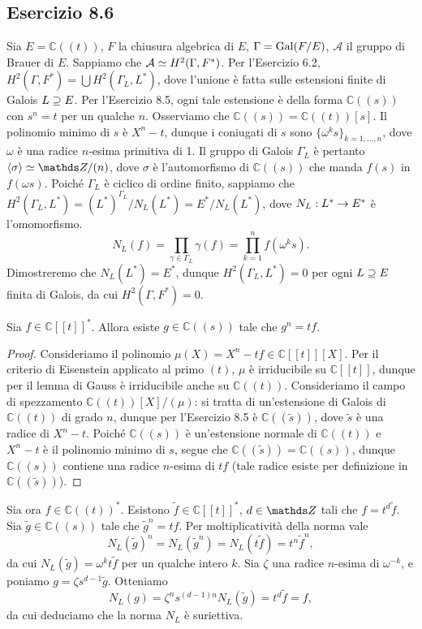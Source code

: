 \documentclass[a4paper]{article}
\newcommand*{\CC}{\mathds{C}}
\begin{document}
\subsection*{Esercizio 8.6}
Sia $E=\CC((t))$, $F$ la chiusura algebrica di $E$, $\Gamma=\operatorname{Gal}(F/E)$, $\mathcal{A}$ il gruppo di Brauer di $E$. Sappiamo che $\mathcal{A}\simeq H^2(\Gamma,F^*)$. Per l'Esercizio 6.2, $H^2(\Gamma, F^*)=\bigcup H^2(\Gamma_L,L^*)$, dove l'unione è fatta sulle estensioni finite di Galois $L\supseteq E$. Per l'Esercizio 8.5, ogni tale estensione è della forma $\CC((s))$ con $s^n=t$ per un qualche $n$. Osserviamo che $\CC((s))=\CC((t))[s]$. Il polinomio minimo di $s$ è $X^n-t$, dunque i coniugati di $s$ sono $\{\omega^ks\}_{k=1,\ldots,n}$, dove $\omega$ è una radice $n$-esima primitiva di 1. Il gruppo di Galois $\Gamma_L$ è pertanto $\langle\sigma\rangle\iso\ZZ/(n)$, dove $\sigma$ è l'automorfismo di $\CC((s))$ che manda $f(s)$ in $f(\omega s)$. Poiché $\Gamma_L$ è ciclico di ordine finito, sappiamo che $H^2(\Gamma_L,L^*)=(L^*)^{\Gamma_L}/N_L(L^*)=E^*/N_L(L^*)$, dove $N_L:L^*\rightarrow E^*$ è l'omomorfismo.
$$
N_L(f)=\prod_{\gamma\in\Gamma_L}\gamma(f)=\prod_{k=1}^{n}f(\omega^ks).
$$
Dimostreremo che $N_L(L^*)=E^*$, dunque $H^2(\Gamma_L,L^*)=0$ per ogni $L\supseteq E$ finita di Galois, da cui $H^2(\Gamma,F^*)=0$.

\begin{lemma*}
Sia $f\in\CC[[t]]^*$. Allora esiste $g\in\CC((s))$ tale che $g^n=tf$.
\end{lemma*}
\begin{proof}
Consideriamo il polinomio $\mu(X)=X^n-tf\in\CC[[t]][X]$. Per il criterio di Eisenstein applicato al primo $(t)$, $\mu$ è irriducibile su $\CC[[t]]$, dunque per il lemma di Gauss è irriducibile anche su $\CC((t))$. Consideriamo il campo di spezzamento $\CC((t))[X]/(\mu)$: si tratta di un'estensione di Galois di $\CC((t))$ di grado $n$, dunque per l'Esercizio 8.5 è $\CC((\tilde{s}))$, dove $\tilde{s}$ è una radice di $X^n-t$. Poiché $\CC((s))$ è un'estensione normale di $\CC((t))$ e $X^n-t$ è il polinomio minimo di $s$, segue che $\CC((\tilde{s}))=\CC((s))$, dunque $\CC((s))$ contiene una radice $n$-esima di $tf$ (tale radice esiste per definizione in $\CC((\tilde{s}))$).
\end{proof}

Sia ora $f\in\CC((t))^*$. Esistono $\tilde{f}\in\CC[[t]]^*$, $d\in\ZZ$ tali che $f=t^d\tilde{f}$. Sia $\tilde{g}\in\CC((s))$ tale che $\tilde{g}^n=tf$. Per moltiplicatività della norma vale
$$
N_L(\tilde{g})^n=N_L(\tilde{g}^n)=N_L(t\tilde{f})=t^n\tilde{f}^n,
$$
da cui $N_L(\tilde{g})=\omega^kt\tilde{f}$ per un qualche intero $k$. Sia $\zeta$ una radice $n$-esima di $\omega^{-k}$, e poniamo $g=\zeta s^{d-1}\tilde{g}$. Otteniamo
$$
N_L(g)=\zeta^ns^{(d-1)n}N_L(\tilde{g})=t^d\tilde{f}=f,
$$
da cui deduciamo che la norma $N_L$ è suriettiva.
\end{document}
